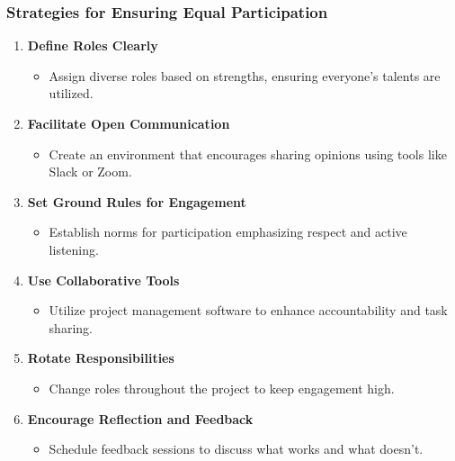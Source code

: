 \documentclass[aspectratio=169]{beamer}
\begin{document}
\begin{frame}[fragile]
    \frametitle{Strategies for Ensuring Equal Participation}
    \begin{enumerate}
        \item \textbf{Define Roles Clearly}
              \begin{itemize}
                \item Assign diverse roles based on strengths, ensuring everyone’s talents are utilized.
              \end{itemize}
        \item \textbf{Facilitate Open Communication}
              \begin{itemize}
                \item Create an environment that encourages sharing opinions using tools like Slack or Zoom.
              \end{itemize}
        \item \textbf{Set Ground Rules for Engagement}
              \begin{itemize}
                \item Establish norms for participation emphasizing respect and active listening.
              \end{itemize}
        \item \textbf{Use Collaborative Tools}
              \begin{itemize}
                \item Utilize project management software to enhance accountability and task sharing.
              \end{itemize}
        \item \textbf{Rotate Responsibilities}
              \begin{itemize}
                \item Change roles throughout the project to keep engagement high.
              \end{itemize}
        \item \textbf{Encourage Reflection and Feedback}
              \begin{itemize}
                \item Schedule feedback sessions to discuss what works and what doesn’t.
              \end{itemize}
    \end{enumerate}
\end{frame}
\end{document}
